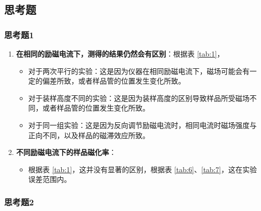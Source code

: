 \documentclass[cn,hazy,pku,12pt,normal,math=newtx,cite=super]{elegantnote}
\begin{document}
\subsection{思考题}

\subsubsection*{思考题1}

\begin{enumerate}
    \item \textbf{在相同的励磁电流下，测得的结果仍然会有区别}：根据表 \ref{tab:1}，
    \begin{itemize}
        \item 对于两次平行的实验：这是因为仪器在相同励磁电流下，磁场可能会有一定的偏差所致，或者样品管的位置发生变化所致。
        \item 对于装样高度不同的实验：这是因为装样高度的区别导致样品所受磁场不同，或者样品管的位置发生变化所致。
        \item 对于同一组实验：这是因为反向调节励磁电流时，相同电流时磁场强度与正向不同，以及样品的磁滞效应所致。
    \end{itemize}
    \item \textbf{不同励磁电流下的样品磁化率}：
    \begin{itemize}
        \item 根据表 \ref{tab:1}，这并没有显著的区别，根据表 \ref{tab:6}、\ref{tab:7}，这在实验误差范围内。
    \end{itemize}
\end{enumerate}

\subsubsection*{思考题2}
\end{document}
